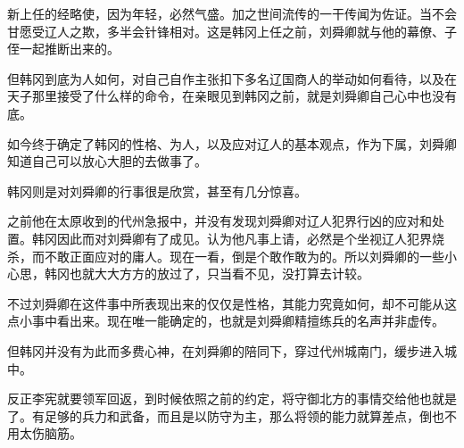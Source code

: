 新上任的经略使，因为年轻，必然气盛。加之世间流传的一干传闻为佐证。当不会甘愿受辽人之欺，多半会针锋相对。这是韩冈上任之前，刘舜卿就与他的幕僚、子侄一起推断出来的。

但韩冈到底为人如何，对自己自作主张扣下多名辽国商人的举动如何看待，以及在天子那里接受了什么样的命令，在亲眼见到韩冈之前，就是刘舜卿自己心中也没有底。

如今终于确定了韩冈的性格、为人，以及应对辽人的基本观点，作为下属，刘舜卿知道自己可以放心大胆的去做事了。

韩冈则是对刘舜卿的行事很是欣赏，甚至有几分惊喜。

之前他在太原收到的代州急报中，并没有发现刘舜卿对辽人犯界行凶的应对和处置。韩冈因此而对刘舜卿有了成见。认为他凡事上请，必然是个坐视辽人犯界烧杀，而不敢正面应对的庸人。现在一看，倒是个敢作敢为的。所以刘舜卿的一些小心思，韩冈也就大大方方的放过了，只当看不见，没打算去计较。

不过刘舜卿在这件事中所表现出来的仅仅是性格，其能力究竟如何，却不可能从这点小事中看出来。现在唯一能确定的，也就是刘舜卿精擅练兵的名声并非虚传。

但韩冈并没有为此而多费心神，在刘舜卿的陪同下，穿过代州城南门，缓步进入城中。

反正李宪就要领军回返，到时候依照之前的约定，将守御北方的事情交给他也就是了。有足够的兵力和武备，而且是以防守为主，那么将领的能力就算差点，倒也不用太伤脑筋。

